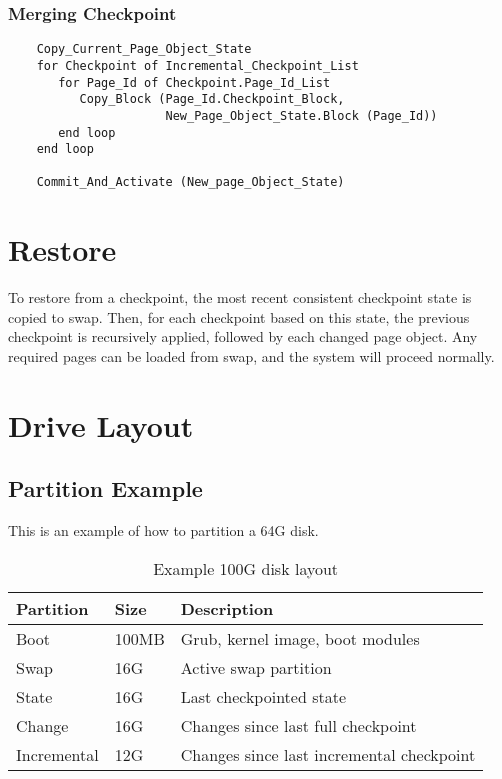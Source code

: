 \subsubsection{Merging Checkpoint}

\begin{verbatim}
    Copy_Current_Page_Object_State
    for Checkpoint of Incremental_Checkpoint_List
       for Page_Id of Checkpoint.Page_Id_List
          Copy_Block (Page_Id.Checkpoint_Block,
                      New_Page_Object_State.Block (Page_Id))
       end loop
    end loop
    
    Commit_And_Activate (New_page_Object_State)
\end{verbatim}

\section{Restore}

To restore from a checkpoint, the most recent consistent checkpoint state is copied to swap.  Then, for each checkpoint based on this state, the previous checkpoint is recursively applied, followed by each changed page object.   Any required pages can be loaded from swap, and the system will proceed normally.

\section{Drive Layout}

\subsection{Partition Example}

This is an example of how to partition a 64G disk.

\begin{table}[ht]
\begin{tabular}{l l l}
\hline\hline
Partition & Size & Description \\
\hline
Boot  & 100MB & Grub, kernel image, boot modules \\
Swap  & 16G & Active swap partition \\
State & 16G & Last checkpointed state \\
Change & 16G & Changes since last full checkpoint \\
Incremental & 12G & Changes since last incremental checkpoint \\
\hline
\end{tabular}
\caption{Example 100G disk layout}
\label{table:100gdisklayout}
\end{table}

